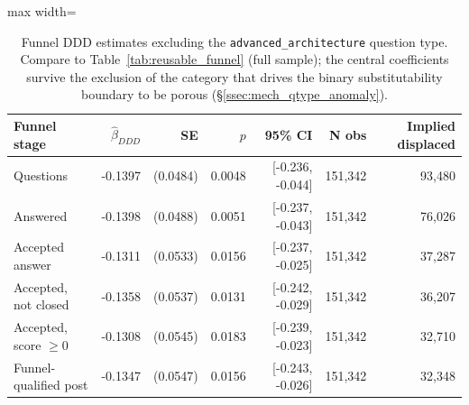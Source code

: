 \begin{table}[ht]
\centering
\caption{Funnel DDD estimates excluding the \texttt{advanced\_architecture} question type. Compare to Table~\ref{tab:reusable_funnel} (full sample); the central coefficients survive the exclusion of the category that drives the binary substitutability boundary to be porous (\S\ref{ssec:mech_qtype_anomaly}).}
\label{tab:funnel_no_advanced_arch}
\small \setlength{\tabcolsep}{4pt}
\begin{adjustbox}{max width=\textwidth}
\begin{tabular}{lrrrrrr}
\toprule
Funnel stage & $\hat\beta_{DDD}$ & SE & $p$ & 95\% CI & N obs & Implied displaced \\
\midrule
Questions & -0.1397 & (0.0484) & 0.0048 & [-0.236, -0.044] & 151,342 & 93,480 \\
Answered & -0.1398 & (0.0488) & 0.0051 & [-0.237, -0.043] & 151,342 & 76,026 \\
Accepted answer & -0.1311 & (0.0533) & 0.0156 & [-0.237, -0.025] & 151,342 & 37,287 \\
Accepted, not closed & -0.1358 & (0.0537) & 0.0131 & [-0.242, -0.029] & 151,342 & 36,207 \\
Accepted, score $\geq 0$ & -0.1308 & (0.0545) & 0.0183 & [-0.239, -0.023] & 151,342 & 32,710 \\
Funnel-qualified post & -0.1347 & (0.0547) & 0.0156 & [-0.243, -0.026] & 151,342 & 32,348 \\
\bottomrule
\end{tabular}
\end{adjustbox}
\end{table}
